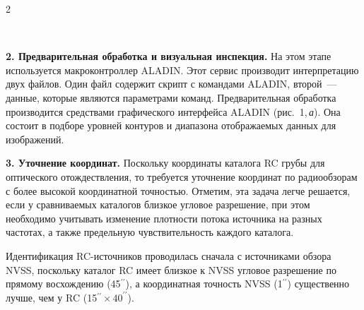 \begin{multicols}{2}
\begin{figure}[b] %
\vspace*{6pt}
 \begin{center}
 \mbox{%
 \epsfxsize=165.339mm
 }
 \end{center}
 \vspace*{-9pt}
\end{figure}




\textbf{2. Предварительная обработка и визуальная инспекция.} На этом этапе используется 
макроконтроллер ALADIN. Этот сервис производит интерпретацию двух файлов. Один 
файл содержит скрипт с командами ALADIN, второй~--- данные, которые являются 
параметрами команд. Предварительная обработка производится средствами графического 
интерфейса ALADIN (рис.~1,\,\textit{а}). Она состоит в подборе уровней контуров и диапазона 
отображаемых данных для изображений.

\textbf{3. Уточнение координат.} Поскольку координаты каталога RC грубы для 
оптического отождествления, то требуется уточнение координат по радиообзорам с более 
высокой координатной точностью. Отметим, эта задача легче решается, если у сравниваемых 
каталогов близкое угловое разрешение, при этом необходимо учитывать изменение 
плотности потока источника на разных частотах, а также предельную чувствительность 
каждого каталога.
      
      Идентификация RC-источников проводилась сначала с источниками обзора 
NVSS, поскольку каталог RC имеет близкое к NVSS угловое разрешение по прямому 
восхождению (45$^{\prime\prime}$), а координатная точность NVSS (1$^{\prime\prime}$) 
существенно лучше, чем у RC (15$^{\prime\prime}\times40^{\prime\prime}$).
      

\end{multicols}
